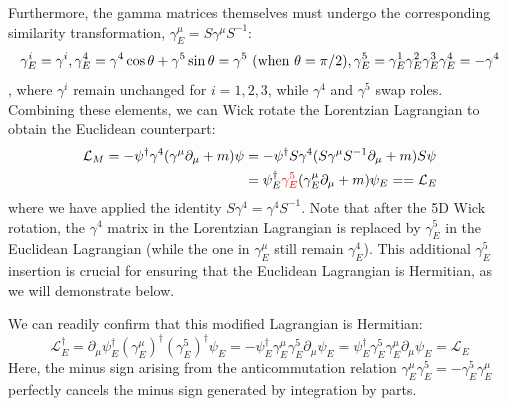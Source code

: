 Furthermore, the gamma matrices themselves must undergo the corresponding similarity transformation, $\gamma_E^\mu=S\gamma^\mu S^{-1}$:
\[\gamma_E^i=\gamma^i, \gamma_E^4=\gamma^4\cos\theta+\gamma^5\sin\theta=\gamma^5\text{ (when }\theta=\pi/2\text{)}, \\ \gamma_E^5=\gamma_E^1\gamma_E^2\gamma_E^3\gamma_E^4=-\gamma^4\]
, where $\gamma^i$ remain unchanged for $i=1,2,3$, while $\gamma^4$ and $\gamma^5$ swap roles. 
Combining these elements, we can Wick rotate the Lorentzian Lagrangian to obtain the Euclidean counterpart:
\begin{equation}
\begin{aligned}
\mathcal{L}_M  = -\psi^\dagger \gamma^4(\gamma^\mu\partial_\mu +m)\psi
&=-\psi^\dagger S\gamma^4(S\gamma^\mu S^{-1}\partial_\mu +m) S\psi\\
&=\psi_E^\dagger \textcolor{red}{\gamma_E^5}(\gamma_E^\mu\partial_\mu +m)\psi_E==\mathcal{L}_E
\end{aligned}
\end{equation}
where we have applied the identity $S\gamma^4=\gamma^4 S^{-1}$. Note that after the 5D Wick rotation, the $\gamma^4$ matrix in the Lorentzian Lagrangian is replaced by $\gamma_E^5$ in the Euclidean Lagrangian (while the one in $\gamma_E^\mu$ still remain $\gamma_E^4$). This additional $\gamma_E^5$ insertion is crucial for ensuring that the Euclidean Lagrangian is Hermitian, as we will demonstrate below.

We can readily confirm that this modified Lagrangian is Hermitian:
\[\mathcal{L}_E^\dagger= \partial_\mu\psi_E^\dagger(\gamma_E^\mu)^\dagger(\gamma_E^5)^\dagger\psi_E=-\psi_E^\dagger\gamma_E^\mu \gamma_E^5\partial_\mu\psi_E =\psi_E^\dagger \gamma_E^5\gamma_E^\mu\partial_\mu\psi_E=\mathcal{L}_E\]
Here, the minus sign arising from the anticommutation relation $\gamma_E^\mu\gamma_E^5=-\gamma_E^5\gamma_E^\mu$ perfectly cancels the minus sign generated by integration by parts.

